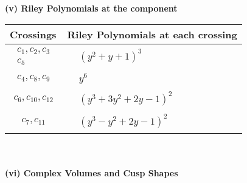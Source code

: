 \documentclass[1p]{elsarticle_modified}
\theoremstyle{definition}
\begin{document}
\newpage\renewcommand{\arraystretch}{1}
\flushleft \textbf{(v) Riley Polynomials at the component}\newline \\
\begin{tabular}{m{50pt}|m{274pt}}
Crossings & \hspace{64pt}Riley Polynomials at each crossing \\
\hline $$\begin{aligned}c_{1},c_{2},c_{3}\\c_{5}\end{aligned}$$&$\begin{aligned}
&(y^2+y+1)^3
\end{aligned}$\\
\hline $$\begin{aligned}c_{4},c_{8},c_{9}\end{aligned}$$&$\begin{aligned}
&y^6
\end{aligned}$\\
\hline $$\begin{aligned}c_{6},c_{10},c_{12}\end{aligned}$$&$\begin{aligned}
&(y^3+3 y^2+2 y-1)^2
\end{aligned}$\\
\hline $$\begin{aligned}c_{7},c_{11}\end{aligned}$$&$\begin{aligned}
&(y^3- y^2+2 y-1)^2
\end{aligned}$\\
\hline
\end{tabular}\\~\\
\newpage\flushleft \textbf{(vi) Complex Volumes and Cusp Shapes}
\end{document}
